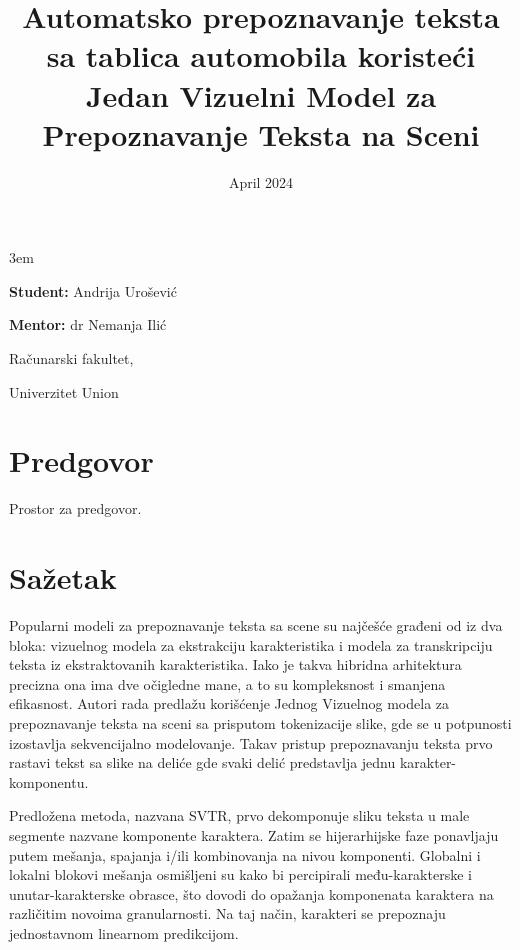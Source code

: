 \documentclass[a4paper,12pt]{article}
\title{Automatsko prepoznavanje teksta sa tablica automobila koristeći Jedan Vizuelni Model za Prepoznavanje Teksta na Sceni}
\date{}
\begin{document}
	\emergencystretch 3em
	\begin{titlepage}
		\centering
		{\huge\bfseries \maketitle}
		
		{\large
			\textbf{Student:}
			Andrija Urošević
			\par
			\bigskip
			\textbf{Mentor:}
			dr Nemanja Ilić
		}
	
		\vfill
		{\large Računarski fakultet,\par}
		{\large Univerzitet Union\par}
		\bigskip
		\date{April 2024}
	\end{titlepage}
	
	
	\section*{Predgovor}
	Prostor za predgovor. 
	\newpage
	
	\tableofcontents
	\newpage
	
	
	\section*{Sažetak}
	Popularni modeli za prepoznavanje teksta sa scene su najčešće građeni od iz dva bloka: vizuelnog modela za ekstrakciju karakteristika i modela za transkripciju teksta iz ekstraktovanih karakteristika. Iako je takva hibridna arhitektura precizna ona ima dve očigledne mane, a to su kompleksnost i smanjena efikasnost. Autori rada predlažu korišćenje Jednog Vizuelnog modela za prepoznavanje teksta na sceni sa prisputom tokenizacije slike, gde se u potpunosti izostavlja sekvencijalno modelovanje. Takav pristup prepoznavanju teksta prvo rastavi tekst sa slike na deliće gde svaki delić predstavlja jednu karakter-komponentu.
	
	Predložena metoda, nazvana SVTR, prvo dekomponuje sliku teksta u male segmente nazvane komponente karaktera. Zatim se hijerarhijske faze ponavljaju putem mešanja, spajanja i/ili kombinovanja na nivou komponenti. Globalni i lokalni blokovi mešanja osmišljeni su kako bi percipirali među-karakterske i unutar-karakterske obrasce, što dovodi do opažanja komponenata karaktera na različitim novoima granularnosti. Na taj način, karakteri se prepoznaju jednostavnom linearnom predikcijom.
	
\end{document}
